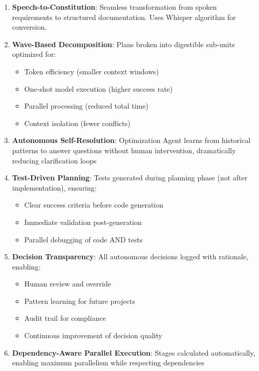 \documentclass[12pt,letterpaper]{article}
\begin{document}
\begin{enumerate}
    \item \textbf{Speech-to-Constitution}: Seamless transformation from spoken requirements to structured documentation. Uses Whisper algorithm for conversion.
    
    \item \textbf{Wave-Based Decomposition}: Plans broken into digestible sub-units optimized for:
    \begin{itemize}
        \item Token efficiency (smaller context windows)
        \item One-shot model execution (higher success rate)
        \item Parallel processing (reduced total time)
        \item Context isolation (fewer conflicts)
    \end{itemize}
    
    \item \textbf{Autonomous Self-Resolution}: Optimization Agent learns from historical patterns to answer questions without human intervention, dramatically reducing clarification loops
    
    \item \textbf{Test-Driven Planning}: Tests generated during planning phase (not after implementation), ensuring:
    \begin{itemize}
        \item Clear success criteria before code generation
        \item Immediate validation post-generation
        \item Parallel debugging of code AND tests
    \end{itemize}
    
    \item \textbf{Decision Transparency}: All autonomous decisions logged with rationale, enabling:
    \begin{itemize}
        \item Human review and override
        \item Pattern learning for future projects
        \item Audit trail for compliance
        \item Continuous improvement of decision quality
    \end{itemize}
    
    \item \textbf{Dependency-Aware Parallel Execution}: Stages calculated automatically, enabling maximum parallelism while respecting dependencies
\end{enumerate}
\end{document}
